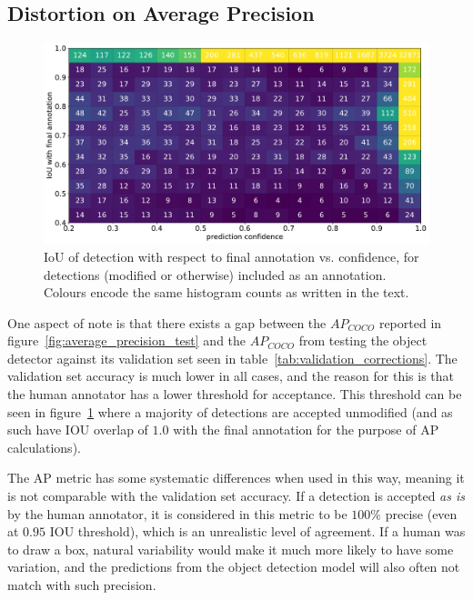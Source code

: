 \subsection{Distortion on Average Precision}
\label{sec:distortion_precision}

\begin{figure}[ht]
\centering
\includegraphics[width=1.0\linewidth]{charts/scatters/confidence_iou.pdf}
\caption{ IoU of detection with respect to final annotation vs. confidence, for detections (modified or otherwise) included as an annotation. Colours encode the same histogram counts as written in the text. }
\label{fig:iou_confidence}
\end{figure}

One aspect of note is that there exists a gap between the $AP_{COCO}$ reported in figure~\ref{fig:average_precision_test} and the $AP_{COCO}$ from testing the object detector against its validation set seen in table~\ref{tab:validation_corrections}. The validation set accuracy is much lower in all cases, and the reason for this is that the human annotator has a lower threshold for acceptance. This threshold can be seen in figure~\ref{fig:iou_confidence} where a majority of detections are accepted unmodified (and as such have \gls{IOU} overlap of $1.0$ with the final annotation for the purpose of \gls{AP} calculations).

The \gls{AP} metric has some systematic differences when used in this way, meaning it is not comparable with the validation set accuracy. If a detection is accepted \emph{as is} by the human annotator, it is considered in this metric to be $100\%$ precise (even at $0.95$ \gls{IOU} threshold), which is an unrealistic level of agreement. If a human was to draw a box, natural variability would make it much more likely to have some variation, and the predictions from the object detection model will also often not match with such precision.

